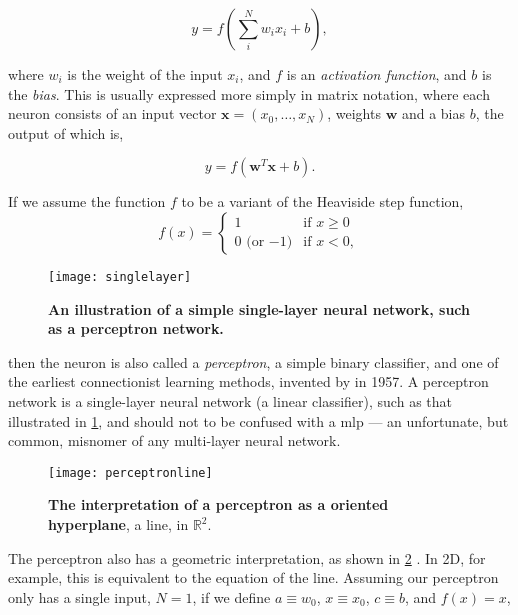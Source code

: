 \documentclass[thesis]{subfiles}
\begin{document}
\begin{equation}
	y = f\left(\sum_{i}^{N} w_i x_i + b\right),
\end{equation}

where $w_i$ is the weight of the input $x_i$, and $f$ is an \emph{activation function}, and $b$ is the \emph{bias}. This is usually expressed more simply in matrix notation, where each neuron consists of an input vector $\mathbf{x}=(x_0,\ldots,x_N)$, weights $\mathbf{w}$ and a bias $b$, the output of which is, %

\begin{equation}
    y = f\left(\mathbf{w}^T\mathbf{x} + b \right).
\end{equation}

If we assume the function $f$ to be a variant of the Heaviside step function,
\begin{equation}
    f(x) = 
\begin{cases}
1 & \text{if } x \geq 0\\
0 \textrm{ (or $-1$)} & \text{if } x < 0,
\end{cases}
\end{equation}

\begin{figure}[tbp]
\centering
\texttt{[image: singlelayer]}
\caption[A single-layer neural network.]{\textbf{An illustration of a simple single-layer neural network, such as a perceptron network.}}
\label{fig:singlelayer}
\end{figure}
then the neuron is also called a \emph{perceptron}, a simple binary classifier, and one of the earliest connectionist learning methods, invented by \citet{rosenblatt1958perceptron} in 1957. A perceptron network is a single-layer neural network (\ie{}a linear classifier), such as that illustrated in \cref{fig:singlelayer}, and should not to be confused with a \gls{mlp} --- an unfortunate, but common, misnomer of any multi-layer neural network.
\begin{figure}[tbp]
\centering
\texttt{[image: perceptronline]}
\caption[The interpretation of a perceptron as a hyperplane.]{\textbf{The interpretation of a perceptron as a oriented hyperplane}, \ie{}a line, in $\mathbb{R}^2$.}
\label{fig:hyperplane}
\end{figure}
The perceptron also has a geometric interpretation, as shown in \cref{fig:hyperplane} \citet{Bishop1995}. In 2D, for example, this is equivalent to the equation of the line. Assuming our perceptron only has a single input, \ie{}$N=1$, if we define $a\equiv w_0$, $x \equiv x_0$, $c \equiv b$, and $f(x) = x$,
\end{document}
